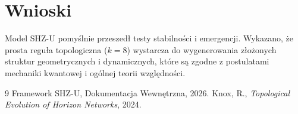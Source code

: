 \documentclass[11pt,a4paper,twocolumn]{article}
\begin{document}
\section{Wnioski}
Model SHZ-U pomyślnie przeszedł testy stabilności i emergencji. Wykazano, że prosta reguła topologiczna ($k=8$) wystarcza do wygenerowania złożonych struktur geometrycznych i dynamicznych, które są zgodne z postulatami mechaniki kwantowej i ogólnej teorii względności.

\begin{thebibliography}{9}
 Framework SHZ-U, Dokumentacja Wewnętrzna, 2026.
 Knox, R., \textit{Topological Evolution of Horizon Networks}, 2024.
\end{thebibliography}
\end{document}
